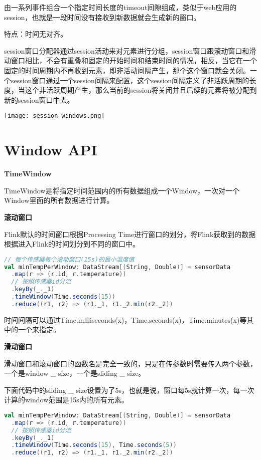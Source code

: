 \documentclass[oneside]{ctexbook}
\begin{document}
由一系列事件组合一个指定时间长度的timeout间隙组成，类似于web应用的session，也就是一段时间没有接收到新数据就会生成新的窗口。

特点：时间无对齐。

session窗口分配器通过session活动来对元素进行分组，session窗口跟滚动窗口和滑动窗口相比，不会有重叠和固定的开始时间和结束时间的情况，相反，当它在一个固定的时间周期内不再收到元素，即非活动间隔产生，那个这个窗口就会关闭。一个session窗口通过一个session间隔来配置，这个session间隔定义了非活跃周期的长度，当这个非活跃周期产生，那么当前的session将关闭并且后续的元素将被分配到新的session窗口中去。

\noindent \texttt{[image: session-windows.png]}

\section{Window API}

\textbf{TimeWindow}

TimeWindow是将指定时间范围内的所有数据组成一个Window，一次对一个Window里面的所有数据进行计算。

\textbf{滚动窗口}

Flink默认的时间窗口根据Processing Time进行窗口的划分，将Flink获取到的数据根据进入Flink的时间划分到不同的窗口中。

\begin{lstlisting}[language=scala]
// 每个传感器每个滚动窗口(15s)的最小温度值
val minTempPerWindow: DataStream[(String, Double)] = sensorData
  .map(r => (r.id, r.temperature))
  // 按照传感器id分流
  .keyBy(_._1)
  .timeWindow(Time.seconds(15))
  .reduce((r1, r2) => (r1._1, r1._2.min(r2._2))
\end{lstlisting}

\sloppy
时间间隔可以通过Time.milliseconds(x)，Time.seconds(x)，Time.minutes(x)等其中的一个来指定。

\textbf{滑动窗口}

滑动窗口和滚动窗口的函数名是完全一致的，只是在传参数时需要传入两个参数，一个是window \_ size，一个是sliding \_ size。

下面代码中的sliding \_ size设置为了5s，也就是说，窗口每5s就计算一次，每一次计算的window范围是15s内的所有元素。

\begin{lstlisting}[language=scala]
val minTempPerWindow: DataStream[(String, Double)] = sensorData
  .map(r => (r.id, r.temperature))
  // 按照传感器id分流
  .keyBy(_._1)
  .timeWindow(Time.seconds(15), Time.seconds(5))
  .reduce((r1, r2) => (r1._1, r1._2.min(r2._2))
\end{lstlisting}
\end{document}
